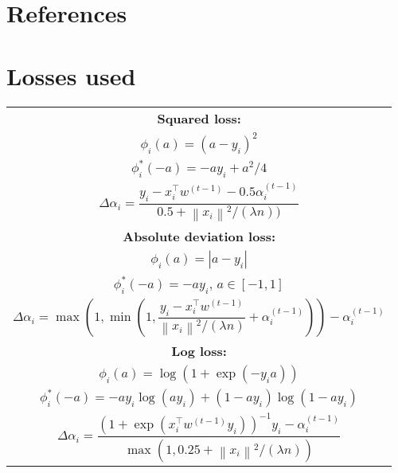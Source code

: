 \documentclass{article}
\newcommand{\abs}[1]{\left|#1\right|}
\newcommand{\norm}[1]{\left\|#1 \right\|}
\begin{document}
\section*{References}


\newpage
\appendix
\section{Losses used}
\label{appendix-losses}

\begin{center}
	\begin{table}[H]
		\centering

		\begin{tabular}{|c|}
			\hline

			\textbf{Squared loss:}\\[1.3em]
			$\phi_i(a) = (a-y_i)^2$\\[1.3em]
			$\phi_i^{*}(-a) = -ay_i+a^2/4$\\[1.3em]
			$\Delta \alpha_i = \dfrac{y_i-x_i^\top w^{(t-1)}-0.5\alpha_i^{(t-1)}}{0.5+\norm{x_i}^2/(\lambda n))}$\\[1.3em]

			\hline

			\textbf{Absolute deviation loss:}\\[1.3em]
			$\phi_i(a) = \abs{a-y_i}$ \\[1.3em]
			$\phi_i^{*}(-a) = -ay_i$, $a \in [-1,1]$\\[1.3em]
			$\Delta \alpha_i = \max \left( 1, \min \left( 1, \dfrac{y_i-x_i^\top w^{(t-1)}}{\norm{x_i}^2/(\lambda n)} + \alpha_i^{(t-1)} \right) \right) - \alpha_i^{(t-1)}$\\[1.3em]
			
			\hline

			\textbf{Log loss:}\\[1.3em]
			$\phi_i(a) = \log(1+\exp(-y_ia))$\\[1.3em]
			$\phi_i^{*}(-a) = -ay_i\log(ay_i) + (1-ay_i)\log(1-ay_i)$\\[1.3em]
			$\Delta \alpha_i = \dfrac{(1+\exp(x_i^\top w^{(t-1)}y_i))^{-1}y_i-\alpha_i^{(t-1)}}{\max(1,0.25+\norm{x_i}^2/(\lambda n))}$\\[1.3em]

			\hline


\end{tabular}
\end{table}
\end{center}
\end{document}
